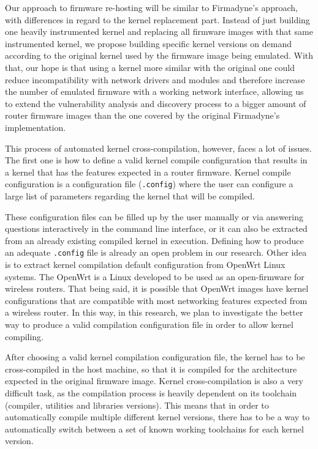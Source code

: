 Our approach to firmware re-hosting will be similar to Firmadyne's \cite{firmadyne} approach, with differences in regard to the kernel replacement part. Instead of just building one heavily instrumented kernel and replacing all firmware images with that same instrumented kernel, we propose building specific kernel versions on demand according to the original kernel used by the firmware image being emulated. With that, our hope is that using a kernel more similar with the original one could reduce incompatibility with network drivers and modules and therefore increase the number of emulated firmware with a working network interface, allowing us to extend the vulnerability analysis and discovery process to a bigger amount of router firmware images than the one covered by the original Firmadyne's \cite{firmadyne} implementation.

This process of automated kernel cross-compilation, however, faces a lot of issues. The first one is how to define a valid kernel compile configuration that results in a kernel that has the features expected in a router firmware. Kernel compile configuration is a configuration file ({\tt .config}) where the user can configure a large list of parameters regarding the kernel that will be compiled.

These configuration files can be filled up by the user manually or via answering questions interactively in the command line interface, or it can also be extracted from an already existing compiled kernel in execution. Defining how to produce an adequate {\tt .config} file is already an open problem in our research. Other idea is to extract kernel compilation default configuration from OpenWrt Linux systems. The OpenWrt is a Linux developed to be used as an open-firmware for wireless routers. That being said, it is possible that OpenWrt images have kernel configurations that are compatible with most networking features expected from a wireless router. In this way, in this research, we plan to investigate the better way to produce a valid compilation configuration file in order to allow kernel compiling.

After choosing a valid kernel compilation configuration file, the kernel has to be cross-compiled in the host machine, so that it is compiled for the architecture expected in the original firmware image. Kernel cross-compilation is also a very difficult task, as the compilation process is heavily dependent on its toolchain (compiler, utilities and libraries versions). This means that in order to automatically compile multiple different kernel versions, there has to be a way to automatically switch between a set of known working toolchains for each kernel version.

